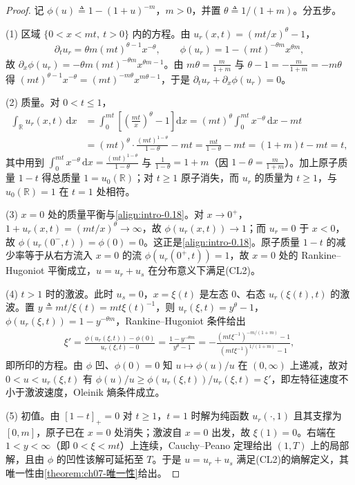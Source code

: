 \documentclass[../main.tex]{subfiles}
\begin{document}
\begin{proof}
记 $\phi(u)\triangleq 1-(1+u)^{-m}$，$m>0$，并置 $\theta\triangleq 1/(1+m)$。分五步。

(1) 区域 $\{0<x<mt,\ t>0\}$ 内的方程。由 $u_r(x,t)=(mt/x)^{\theta}-1$，
\begin{align*}
\partial_t u_r=\theta m(mt)^{\theta-1}x^{-\theta},
\qquad
\phi(u_r)=1-(mt)^{-\theta m}x^{\theta m},
\end{align*}
故 $\partial_x\phi(u_r)=-\theta m(mt)^{-\theta m}x^{\theta m-1}$。由 $m\theta=\tfrac{m}{1+m}$ 与 $\theta-1=-\tfrac{m}{1+m}=-m\theta$ 得 $(mt)^{\theta-1}x^{-\theta}=(mt)^{-m\theta}x^{m\theta-1}$，于是 $\partial_t u_r+\partial_x\phi(u_r)=0$。

(2) 质量。对 $0<t\leqslant1$，
\begin{align*}
\int_{\mathbb{R}}u_r(x,t)\,\mathrm{d}x
&=\int_0^{mt}\left[\left(\frac{mt}{x}\right)^{\theta}-1\right]\mathrm{d}x
=(mt)^{\theta}\int_0^{mt}x^{-\theta}\,\mathrm{d}x-mt\\
&=(mt)^{\theta}\cdot\frac{(mt)^{1-\theta}}{1-\theta}-mt
=\frac{mt}{1-\theta}-mt=(1+m)t-mt=t,
\end{align*}
其中用到 $\int_0^{mt}x^{-\theta}\,\mathrm{d}x=\frac{(mt)^{1-\theta}}{1-\theta}$ 与 $\frac{1}{1-\theta}=1+m$（因 $1-\theta=\frac{m}{1+m}$）。加上原子质量 $1-t$ 得总质量 $1=u_0(\mathbb{R})$；对 $t\geqslant1$ 原子消失，而 $u_r$ 的质量为 $t\geqslant1$，与 $u_0(\mathbb{R})=1$ 在 $t=1$ 处相符。

(3) $x=0$ 处的质量平衡与\eqref{align:intro-0.18}。对 $x\to0^+$，$1+u_r(x,t)=(mt/x)^{\theta}\to\infty$，故 $\phi(u_r(x,t))\to1$；而 $u_r=0$ 于 $x<0$，故 $\phi(u_r(0^-,t))=\phi(0)=0$。这正是\eqref{align:intro-0.18}。原子质量 $1-t$ 的减少率等于从右方流入 $x=0$ 的流 $\phi(u_r(0^+,t))=1$，故 $x=0$ 处的 Rankine--Hugoniot 平衡成立，$u=u_r+u_s$ 在分布意义下满足(CL2)。

(4) $t>1$ 时的激波。此时 $u_s=0$，$x=\xi(t)$ 是左态 $0$、右态 $u_r(\xi(t),t)$ 的激波。置 $y\triangleq mt/\xi(t)=mt\xi(t)^{-1}$，则 $u_r(\xi,t)=y^{\theta}-1$，$\phi(u_r(\xi,t))=1-y^{-\theta m}$，Rankine--Hugoniot 条件给出
\begin{align*}
\xi'=\frac{\phi(u_r(\xi,t))-\phi(0)}{u_r(\xi,t)-0}
=\frac{1-y^{-\theta m}}{y^{\theta}-1}
=-\frac{(mt\xi^{-1})^{-m/(1+m)}-1}{(mt\xi^{-1})^{1/(1+m)}-1},
\end{align*}
即所印的方程。由 $\phi$ 凹、$\phi(0)=0$ 知 $u\mapsto\phi(u)/u$ 在 $(0,\infty)$ 上递减，故对 $0<u<u_r(\xi,t)$ 有 $\phi(u)/u\geqslant\phi(u_r(\xi,t))/u_r(\xi,t)=\xi'$，即左特征速度不小于激波速度，Oleinik 熵条件成立。

(5) 初值。由 $[1-t]_+=0$ 对 $t\geqslant1$，$t=1$ 时解为纯函数 $u_r(\cdot,1)$ 且其支撑为 $[0,m]$，原子已在 $x=0$ 处消失；激波自 $x=0$ 出发，故 $\xi(1)=0$。右端在 $1<y<\infty$（即 $0<\xi<mt$）上连续，Cauchy--Peano 定理给出 $(1,T)$ 上的局部解，且由 $\phi$ 的凹性该解可延拓至 $T$。于是 $u=u_r+u_s$ 满足(CL2)的熵解定义，其唯一性由\cref{theorem:ch07-唯一性}给出。
\end{proof}
\end{document}
